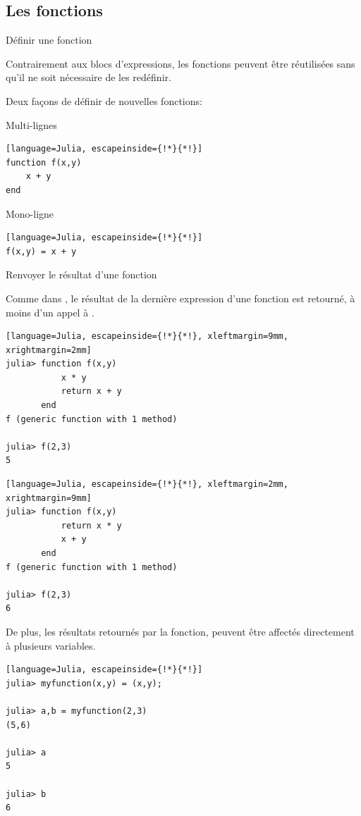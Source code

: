 \subsection{Les fonctions}
\begin{frame}[containsverbatim]{Définir une fonction}
\par{Contrairement aux blocs d'expressions, les fonctions peuvent être réutilisées sans qu'il ne soit nécessaire de les redéfinir.}
\vspace{2ex}
\par{Deux façons de définir de nouvelles fonctions:}\vspace{2ex}
\par{\textcolor{springgreen3}{} Multi-lignes}
\begin{lstlisting}[language=Julia, escapeinside={!*}{*!}]
function f(x,y)
    x + y
end
\end{lstlisting}
\vspace{2ex}
\par{\textcolor{springgreen3}{} Mono-ligne}
\begin{lstlisting}[language=Julia, escapeinside={!*}{*!}]
f(x,y) = x + y
\end{lstlisting}
\end{frame}


\begin{frame}[containsverbatim]{Renvoyer le résultat d'une fonction}
\par{Comme dans {\raisebox{-0.5ex}{\R}}, le résultat de la dernière expression d'une fonction est retourné, à moins d'un appel à .}
\vspace{-2ex}
\begin{multicols}{2}
\begin{lstlisting}[language=Julia, escapeinside={!*}{*!}, xleftmargin=9mm, xrightmargin=2mm]
julia> function f(x,y)
           x * y
           return x + y
       end
f (generic function with 1 method)

julia> f(2,3)
5
\end{lstlisting}
\begin{lstlisting}[language=Julia, escapeinside={!*}{*!}, xleftmargin=2mm, xrightmargin=9mm]
julia> function f(x,y)
           return x * y
           x + y
       end
f (generic function with 1 method)

julia> f(2,3)
6
\end{lstlisting}
\end{multicols}
\vspace{-2ex}
\par{De plus, les résultats retournés par la fonction, peuvent être affectés directement à plusieurs variables.}
\begin{lstlisting}[language=Julia, escapeinside={!*}{*!}]
julia> myfunction(x,y) = (x,y);

julia> a,b = myfunction(2,3)
(5,6)

julia> a
5

julia> b
6
\end{lstlisting}
\end{frame}


